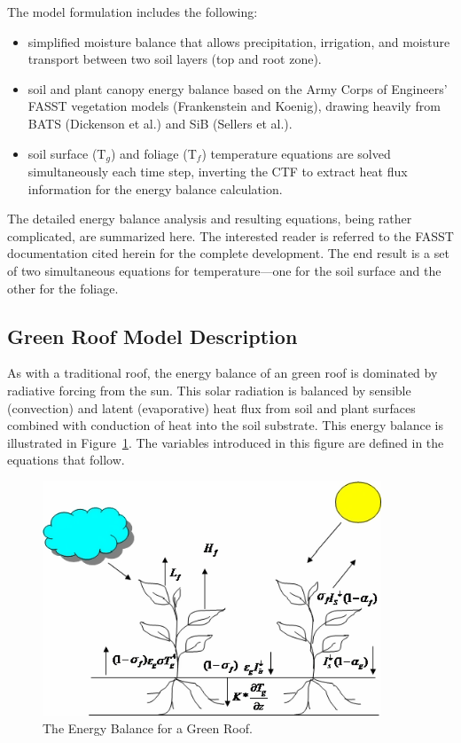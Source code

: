 The model formulation includes the following:

\begin{itemize}
\item
  simplified moisture balance that allows precipitation, irrigation, and moisture transport between two soil layers (top and root zone).
\item
  soil and plant canopy energy balance based on the Army Corps of Engineers' FASST vegetation models (Frankenstein and Koenig), drawing heavily from BATS (Dickenson et al.) and SiB (Sellers et al.).
\item
  soil surface (T\(_{g}\)) and foliage (T\(_{f}\)) temperature equations are solved simultaneously each time step, inverting the CTF to extract heat flux information for the energy balance calculation.
\end{itemize}

The detailed energy balance analysis and resulting equations, being rather complicated, are summarized here. The interested reader is referred to the FASST documentation cited herein for the complete development. The end result is a set of two simultaneous equations for temperature---one for the soil surface and the other for the foliage.

\subsection{Green Roof Model Description}\label{green-roof-model-description}

As with a traditional roof, the energy balance of an green roof is dominated by radiative forcing from the sun. This solar radiation is balanced by sensible (convection) and latent (evaporative) heat flux from soil and plant surfaces combined with conduction of heat into the soil substrate. This energy balance is illustrated in Figure~\ref{fig:the-energy-balance-for-a-green-roof.}. The variables introduced in this figure are defined in the equations that follow.

\begin{figure}[hbtp] %
\centering
\includegraphics[width=0.9\textwidth, height=0.9\textheight, keepaspectratio=true]{media/image509.png}
\caption{  The Energy Balance for a Green Roof. \protect \label{fig:the-energy-balance-for-a-green-roof.}}
\end{figure}

